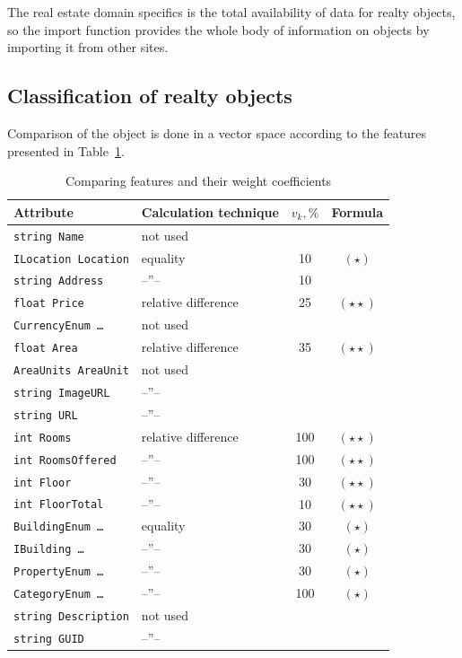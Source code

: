 \documentclass[conference]{IEEEtran}
\begin{document}
The real estate domain specifics is the total availability of data for realty objects, so the import function provides the whole body of information on objects by importing it from other sites.


\subsection{Classification of realty objects}
\label{sec:class-realty}


Comparison of the object is done in a vector space according to the features presented in Table~\ref{tab:cmp}.
\begin{table}[tb]
  \caption{Comparing features and their weight coefficients}
  \label{tab:cmp}
  \footnotesize
  \centering
  \begin{tabular}{|l|l|c|c|}
    \hline
    Attribute & Calculation technique & $v_k, \%$ & Formula \\
    \hline
\texttt{string Name} & not used & & \\
    \texttt{ILocation Location} & equality & 10 & $(\star)$
    \\
\texttt{string Address} & --''-- & 10 & \\
\texttt{float Price} & relative difference & 25 & $(\star\star)$\\
\texttt{CurrencyEnum \ldots} & not used  & & \\
\texttt{float Area} & relative difference  & 35 & $(\star\star)$\\
\texttt{AreaUnits AreaUnit} & not used & &\\
\texttt{string ImageURL} & --''-- & & \\
\texttt{string URL} & --''-- & & \\
\texttt{int Rooms}  & relative difference  & 100 & $(\star\star)$\\
\texttt{int RoomsOffered} &  --''--   & 100 & $(\star\star)$\\
\texttt{int Floor}  &  --''--   & 30 & $(\star\star)$\\
\texttt{int FloorTotal}  &  --''--   & 10 & $(\star\star)$\\
\texttt{BuildingEnum \ldots}  & equality & 30 & $(\star)$\\
\texttt{IBuilding \ldots{}}  & --''-- & 30 &  $(\star)$\\
\texttt{PropertyEnum \ldots} & --''-- & 30 &  $(\star)$\\
\texttt{CategoryEnum \ldots} & --''-- & 100 &  $(\star)$\\
\texttt{string Description} & not used & & \\
    \texttt{string GUID} & --''-- & & \\
    \hline
  \end{tabular}
\end{table}
\end{document}
